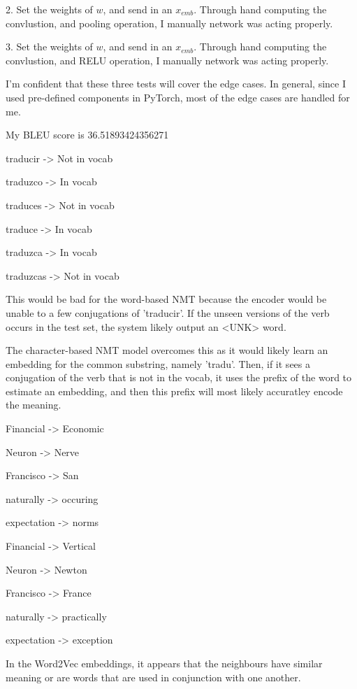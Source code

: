 \documentclass[11pt,largemargins]{homework}
\begin{document}
2. Set the weights of $w$, and send in an $x_{emb}$. Through hand computing the convlustion, and pooling operation, I manually network was acting properly. 

3. Set the weights of $w$, and send in an $x_{emb}$. Through hand computing the convlustion, and RELU operation, I manually network was acting properly. 

I'm confident that these three tests will cover the edge cases. In general, since I used pre-defined components in PyTorch, most of the edge cases are handled for me. 

\question 

My BLEU score is 36.51893424356271

\question 

traducir -> Not in vocab 

traduzco -> In vocab 

traduces -> Not in vocab 

traduce -> In vocab 

traduzca -> In vocab 
 
traduzcas -> Not in vocab 


This would be bad for the word-based NMT because the encoder would be unable to a few conjugations of 'traducir'. If the unseen versions of the verb occurs in the test set, the system likely output an <UNK> word. 

The character-based NMT model overcomes this as it would likely learn an embedding for the common substring, namely 'tradu'. Then, if it sees a conjugation of the verb that is not in the vocab, it uses the prefix of the word to estimate an embedding, and then this prefix will most likely accuratley encode the meaning. 

\question

Financial -> Economic

Neuron -> Nerve

Francisco -> San

naturally -> occuring 

expectation -> norms 

\question 


Financial -> Vertical

Neuron -> Newton

Francisco -> France 

naturally -> practically 

expectation -> exception 


\question

In the Word2Vec embeddings, it appears that the neighbours have similar meaning or are words that are used in conjunction with one another.
\end{document}
